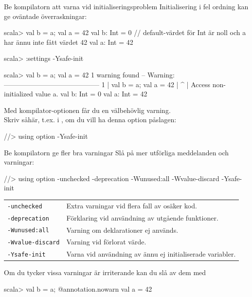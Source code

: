 \begin{Slide}{Be kompilatorn att varna vid initialiseringsproblem}
\SlideFontSmall
Initialisering i fel ordning kan ge oväntade överraskningar:
\begin{REPLsmall}
scala> { val b = a; val a = 42 }
val b: Int = 0   // default-värdet för Int är noll och a har ännu inte fått värdet 42
val a: Int = 42

scala> :settings -Ysafe-init

scala> { val b = a; val a = 42 }
1 warning found
-- Warning: ------------------------------------------
1 |{ val b = a; val a = 42 }
  |                 ^
  |                 Access non-initialized value a.
val b: Int = 0
val a: Int = 42
\end{REPLsmall}
Med kompilator-optionen  får du en välbehövlig varning. \\
Skriv såhär, t.ex. i , om du vill ha denna option påslagen:
\begin{CodeSmall}
//> using option -Ysafe-init
\end{CodeSmall}
\end{Slide}

\begin{Slide}{Be kompilatorn ge fler bra varningar}\SlideFontSmall
Slå på mer utförliga meddelanden och varningar:
\begin{CodeSmall}
//> using option -unchecked -deprecation -Wunused:all -Wvalue-discard -Ysafe-init
\end{CodeSmall}
\begin{tabular}{l p{8.5cm}}
\texttt{-unchecked} & Extra varningar vid flera fall av osäker kod. \\
\texttt{-deprecation} & Förklaring vid användning av utgående funktioner. \\
\texttt{-Wunused:all} & Varning om deklarationer ej används. \\
\texttt{-Wvalue-discard} & Varning vid förlorat värde. \\
\texttt{-Ysafe-init} & Varna vid användning av ännu ej initialiserade variabler. \\
\end{tabular}

\pause\vspace*{1em}
Om du tycker vissa varningar är irriterande kan du slå av dem med  
\begin{CodeSmall}
scala> { val b = a; @annotation.nowarn val a = 42 }
\end{CodeSmall}
  
\end{Slide}

